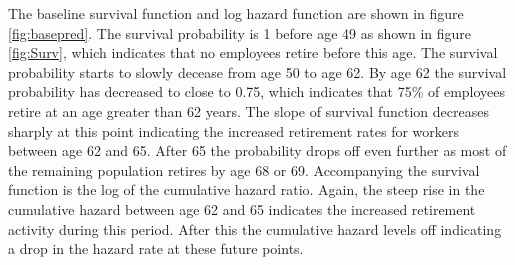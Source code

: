 \documentclass[12pt,letterpaper]{article}
\begin{document}
The baseline survival function and log hazard function are shown in figure \ref{fig:basepred}. The survival probability is 1 before age 49 as shown in figure \ref{fig:Surv}, which indicates that no employees retire before this age. The survival probability starts to slowly decease from age 50 to age 62. By age 62 the survival probability has decreased to close to 0.75, which indicates that 75\% of employees retire at an age greater than 62 years.  The slope of survival function decreases sharply at this point indicating the increased retirement rates for workers between age 62 and 65.  After 65 the probability drops off even further as most of the remaining population retires by age 68 or 69. Accompanying the survival function is the log of the cumulative hazard ratio.  Again, the steep rise in the cumulative hazard between age 62 and 65 indicates the increased retirement activity during this period.  After this the cumulative hazard levels off indicating a drop in the hazard rate at these future points.



\end{document}
